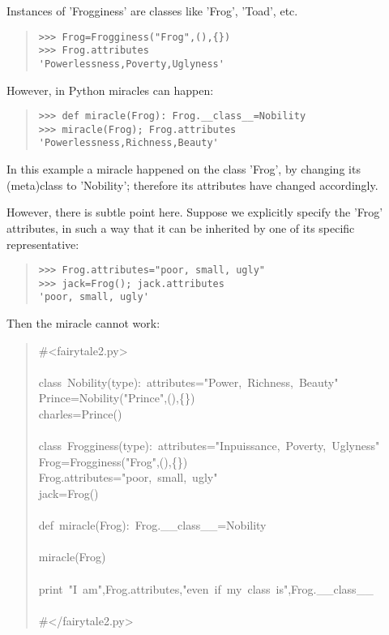\documentclass[10pt,english]{article}
\begin{document}
Instances of 'Frogginess' are classes like 'Frog', 'Toad', etc.
\begin{quote}
\begin{verbatim}>>> Frog=Frogginess("Frog",(),{})
>>> Frog.attributes
'Powerlessness,Poverty,Uglyness'\end{verbatim}
\end{quote}

However, in Python miracles can happen:
\begin{quote}
\begin{verbatim}>>> def miracle(Frog): Frog.__class__=Nobility
>>> miracle(Frog); Frog.attributes
'Powerlessness,Richness,Beauty'\end{verbatim}
\end{quote}

In this example a miracle happened on the class 'Frog', by changing its
(meta)class to 'Nobility'; therefore its attributes have changed accordingly.

However, there is subtle point here. Suppose we explicitly specify the 'Frog'
attributes, in such a way that it can be inherited by one of its specific
representative:
\begin{quote}
\begin{verbatim}>>> Frog.attributes="poor, small, ugly"
>>> jack=Frog(); jack.attributes
'poor, small, ugly'\end{verbatim}
\end{quote}

Then the miracle cannot work:
\begin{quote}
\begin{ttfamily}\begin{flushleft}
\mbox{{\#}<fairytale2.py>}\\
\mbox{}\\
\mbox{class~Nobility(type):~attributes="Power,~Richness,~Beauty"}\\
\mbox{Prince=Nobility("Prince",(),{\{}{\}})}\\
\mbox{charles=Prince()}\\
\mbox{}\\
\mbox{class~Frogginess(type):~attributes="Inpuissance,~Poverty,~Uglyness"}\\
\mbox{Frog=Frogginess("Frog",(),{\{}{\}})}\\
\mbox{Frog.attributes="poor,~small,~ugly"}\\
\mbox{jack=Frog()}\\
\mbox{}\\
\mbox{def~miracle(Frog):~Frog.{\_}{\_}class{\_}{\_}=Nobility}\\
\mbox{}\\
\mbox{miracle(Frog)}\\
\mbox{}\\
\mbox{print~"I~am",Frog.attributes,"even~if~my~class~is",Frog.{\_}{\_}class{\_}{\_}}\\
\mbox{}\\
\mbox{{\#}</fairytale2.py>}
\end{flushleft}\end{ttfamily}
\end{quote}
\end{document}
